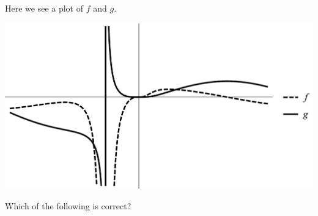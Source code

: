 \documentclass{ximera}
\author{Bart Snapp}
\begin{document}
\begin{exercise}
Here we see a plot of $f$ and $g$. 
\begin{image}
\includegraphics[width=.5\textwidth]{graphFandG4.png}
\end{image}
Which of the following is correct?
\begin{multipleChoice}
\end{multipleChoice}
\end{exercise}
\end{document}
